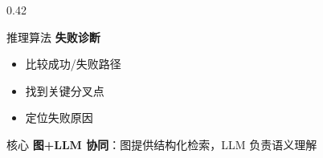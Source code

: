 \documentclass[aspectratio=169,10pt]{beamer}
\begin{document}
\begin{frame}
\begin{columns}[T]
\begin{column}{0.42\textwidth}
\begin{block}{推理算法}
        \textbf{失败诊断}
        \begin{itemize}
          \item 比较成功/失败路径
          \item 找到关键分叉点
          \item 定位失败原因
        \end{itemize}
      \end{block}

      \vspace{0.2cm}

      \begin{alertblock}{核心}
        \tiny
        \textbf{图+LLM 协同}：图提供结构化检索，LLM 负责语义理解
      \end{alertblock}
    \end{column}
  \end{columns}
\end{frame}
\end{document}
